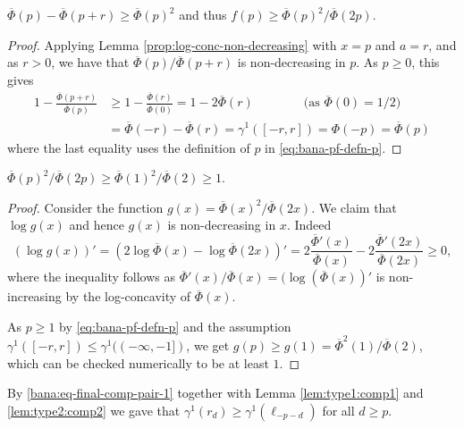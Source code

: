 \begin{lemma}
\label{lem:type1:comp1}
$\overline{\Phi}(p)-\overline{\Phi}(p+r) \geq \overline\Phi(p)^2$ and thus $f(p) \geq \overline\Phi(p)^2/\overline\Phi(2p)$.
\end{lemma}
\begin{proof}
Applying Lemma \ref{prop:log-conc-non-decreasing}  with $x=p$ and $a=r$, and as $r> 0$, we have that 
$\overline{\Phi}(p)/\overline{\Phi}(p+r)$ is non-decreasing in $p$. 
As $p\geq 0$, this gives %
\begin{align*}
    1-\frac{\overline{\Phi}(p+r)}{\overline{\Phi}(p)}  &  \geq  1-\frac{\overline{\Phi}(r)}{\overline{\Phi}(0)} = 1-2\overline{\Phi}(r) \qquad \qquad  \text{(as $\overline{\Phi}(0)=1/2$)}\\
& = \overline{\Phi}(-r) - \overline{\Phi}(r) = \gamma^1([-r,r])= \Phi(-p) =\overline{\Phi}(p) 
\end{align*} 
where the last equality uses the definition of $p$ in \eqref{eq:bana-pf-defn-p}. 
\end{proof}
\begin{lemma}
\label{lem:type2:comp2}
$\overline\Phi(p)^2/\overline\Phi(2p) \geq \overline\Phi(1)^2/\overline\Phi(2) \geq 1$. 
\end{lemma}
\begin{proof}
   Consider the function $g(x) =\overline{\Phi}(x)^2/\overline{\Phi}(2x)$. We claim that $\log g(x)$ and hence $g(x)$ is non-decreasing in $x$. Indeed
   \[(\log g(x))' = (2 \log \overline{\Phi}(x) - \log \overline{\Phi}(2x))'= 2\frac{\overline{\Phi}'(x)}{\overline{\Phi}(x)} -  2\frac{\overline{\Phi}'(2x)}{\overline{\Phi}(2x)} \geq 0,\]
where the inequality follows as $\overline{\Phi}'(x)/\overline{\Phi}(x) = (\log (\overline{\Phi}(x))'$ is non-increasing by the log-concavity of $\overline{\Phi}(x)$. 

As $p \geq 1$ by \eqref{eq:bana-pf-defn-p} and the assumption $\gamma^1([-r,r]) \leq \gamma^1((-\infty,-1])$, we get $g(p) \geq g(1) = \overline\Phi^2(1)/\overline\Phi(2)$, which can be checked numerically to be at least $1$.
\end{proof}
By \eqref{bana:eq-final-comp-pair-1} together with  Lemma \ref{lem:type1:comp1} and \ref{lem:type2:comp2} we gave that $\gamma^1(r_d) \geq \gamma^1(\ell_{-p-d})$ for all $d\geq p$.


